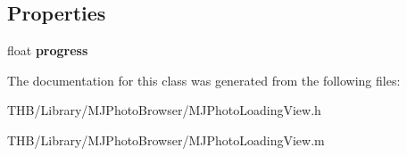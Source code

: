 \subsection*{Properties}
\begin{DoxyCompactItemize}
\item 
\mbox{\label{interface_m_j_photo_loading_view_ab3a07485ae160075824cd43d1d2ec034}} 
float {\bfseries progress}
\end{DoxyCompactItemize}


The documentation for this class was generated from the following files\+:\begin{DoxyCompactItemize}
\item 
T\+H\+B/\+Library/\+M\+J\+Photo\+Browser/M\+J\+Photo\+Loading\+View.\+h\item 
T\+H\+B/\+Library/\+M\+J\+Photo\+Browser/M\+J\+Photo\+Loading\+View.\+m\end{DoxyCompactItemize}
